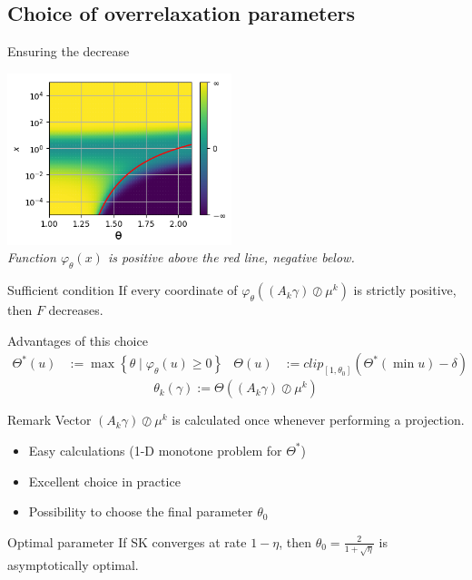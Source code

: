 \documentclass[compress]{beamer}
\begin{document}
\subsection[Choice of OR parameters]{Choice of overrelaxation parameters}
\begin{frame}{Ensuring the decrease}
\begin{center}
	\vspace*{-0.2cm}\includegraphics[height=5cm]{images/cvgce_zone_2.png}\vspace{-0.2cm}\\
	{\small \em Function $\varphi_\theta(x)$ is positive above the red line, negative below.}
\end{center}
\pause
\begin{block}{Sufficient condition}
	If every coordinate of $\varphi_\theta \left((A_k \gamma) \oslash \mu^k \right)$ is strictly positive, then $F$ decreases.
\end{block}
\end{frame}

\begin{frame}{Advantages of this choice}
	\begin{align*}
	\Theta^*(u) &:= \max \left\{\theta \mid \varphi_\theta(u) \ge 0 \right\}
	&
	\Theta(u) &:= clip_{[1,\theta_0]}(\Theta^*(\min u)-\delta)
	\end{align*}
	\[
	\theta_k (\gamma) := \Theta((A_k \gamma) \oslash \mu^k)
	\]
	
	\begin{block}{Remark}
		Vector $(A_k \gamma)\oslash \mu^k$ is calculated once whenever performing a projection.
	\end{block}
	\pause
	\begin{itemize}
		\item Easy calculations (1-D monotone problem for $\Theta^*$)
		\item Excellent choice in practice
		\item Possibility to choose the final parameter $\theta_0$
	\end{itemize}
	\pause
	\begin{block}{Optimal parameter}
		If SK converges at rate $1-\eta$, then $\theta_0 = \frac{2}{1+\sqrt{\eta}}$ is asymptotically optimal.
	\end{block}
\end{frame}
\end{document}
